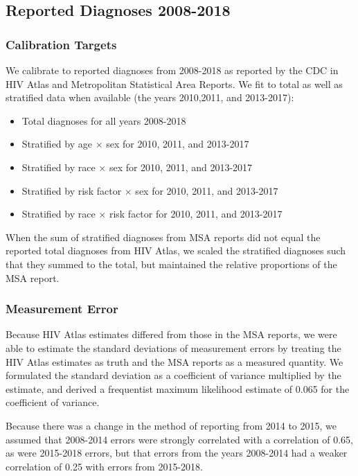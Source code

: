 \documentclass{article}
\begin{document}
\subsection{Reported Diagnoses 2008-2018}

\subsubsection{Calibration Targets}
We calibrate to reported diagnoses from 2008-2018 as reported by the CDC in HIV Atlas\cite{hivatlas} and Metropolitan Statistical Area Reports\cite{msa2010,msa2011,msa2013,msa2014,msa2015,msa2016,cdc24.2}. We fit to total as well as stratified data when available (the years 2010,2011, and 2013-2017):
\begin{itemize}
	\item Total diagnoses for all years 2008-2018
	\item Stratified by age $\times$ sex for 2010, 2011, and 2013-2017
	\item Stratified by race $\times$ sex for 2010, 2011, and 2013-2017
	\item Stratified by risk factor $\times$ sex for 2010, 2011, and 2013-2017
	\item Stratified by race $\times$ risk factor for 2010, 2011, and 2013-2017
\end{itemize}

When the sum of stratified diagnoses from MSA reports did not equal the reported total diagnoses from HIV Atlas, we scaled the stratified diagnoses such that they summed to the total, but maintained the relative proportions of the MSA report.

\subsubsection{Measurement Error}

Because HIV Atlas estimates differed from those in the MSA reports, we were able to estimate the standard deviations of measurement errors by treating the HIV Atlas estimates as truth and the MSA reports as a measured quantity. We formulated the standard deviation as a coefficient of variance multiplied by the estimate, and derived a frequentist maximum likelihood estimate of 0.065 for the coefficient of variance.

Because there was a change in the method of reporting from 2014 to 2015, we assumed that 2008-2014 errors were strongly correlated with a correlation of 0.65, as were 2015-2018 errors, but that errors from the years 2008-2014 had a weaker correlation of 0.25 with errors from 2015-2018.
\end{document}
